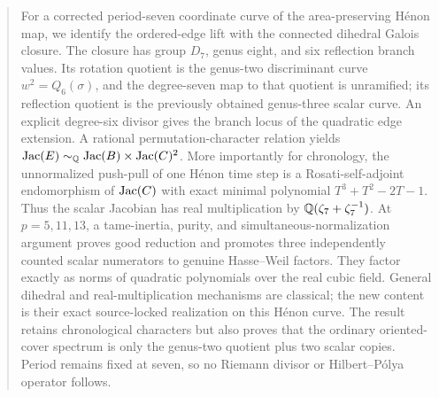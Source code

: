 \begin{abstract}
For a corrected period-seven coordinate curve of the area-preserving H\'enon
map, we identify the ordered-edge lift with the connected dihedral Galois
closure.  The closure has group $D_7$, genus eight, and six reflection branch
values.  Its rotation quotient is the genus-two discriminant curve
$w^2=Q_6(\sigma)$, and the degree-seven map to that quotient is unramified;
its reflection quotient is the previously obtained genus-three scalar curve.
An explicit degree-six divisor gives the branch locus of the quadratic edge
extension.  A rational permutation-character relation yields
$\Jac(E)\sim_\Q\Jac(B)\times\Jac(C)^2$.  More importantly for chronology,
the unnormalized push-pull of one H\'enon time step is a Rosati-self-adjoint
endomorphism of $\Jac(C)$ with exact minimal polynomial
$T^3+T^2-2T-1$.  Thus the scalar Jacobian has real multiplication by
$\Q(\zeta_7+\zeta_7^{-1})$.  At $p=5,11,13$, a tame-inertia, purity, and
simultaneous-normalization argument proves good reduction and promotes three
independently counted scalar numerators to genuine Hasse--Weil factors.  They
factor exactly as norms of quadratic polynomials over the real cubic field.
General dihedral and real-multiplication mechanisms are classical;
the new content is their exact source-locked realization on this H\'enon
curve.  The result retains chronological characters but also proves that the
ordinary oriented-cover spectrum is only the genus-two quotient plus two
scalar copies.  Period remains fixed at seven, so no Riemann divisor or
Hilbert--P\'olya operator follows.
\end{abstract}

